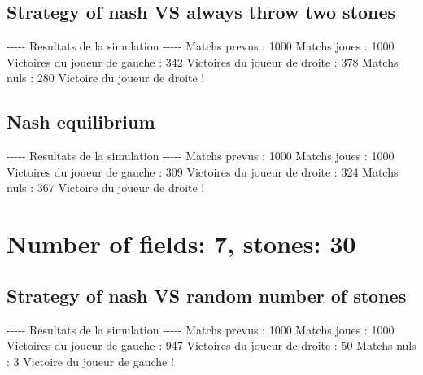 \documentclass{article}%
\begin{document}
%
\subsection{Strategy of nash VS always throw two stones}%
\label{subsec:Strategy of nash VS always throw two stones}%
{-}{-}{-}{-}{-} Resultats de la simulation {-}{-}{-}{-}{-}\newline%
		\newline%
Matchs prevus : 1000\newline%
Matchs joues : 1000\newline%
\newline%
Victoires du joueur de gauche : 342\newline%
Victoires du joueur de droite : 378\newline%
Matchs nuls : 280\newline%
\newline%
Victoire du joueur de droite !

%
\subsection{Nash equilibrium}%
\label{subsec:Nash equilibrium}%
{-}{-}{-}{-}{-} Resultats de la simulation {-}{-}{-}{-}{-}\newline%
		\newline%
Matchs prevus : 1000\newline%
Matchs joues : 1000\newline%
\newline%
Victoires du joueur de gauche : 309\newline%
Victoires du joueur de droite : 324\newline%
Matchs nuls : 367\newline%
\newline%
Victoire du joueur de droite !

%
\section{Number of fields: 7, stones: 30}%
\label{sec:Number of fields 7, stones 30}%
\subsection{Strategy of nash VS random number of stones}%
\label{subsec:Strategy of nash VS random number of stones}%
{-}{-}{-}{-}{-} Resultats de la simulation {-}{-}{-}{-}{-}\newline%
		\newline%
Matchs prevus : 1000\newline%
Matchs joues : 1000\newline%
\newline%
Victoires du joueur de gauche : 947\newline%
Victoires du joueur de droite : 50\newline%
Matchs nuls : 3\newline%
\newline%
Victoire du joueur de gauche !
\end{document}
